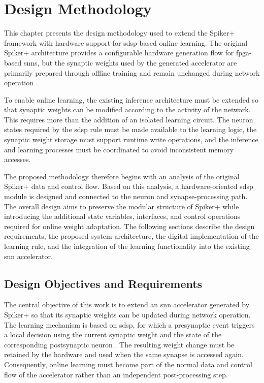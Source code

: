 \chapter{Design Methodology}
\label{sec:design_methodology}

This chapter presents the design methodology used to extend the Spiker+ framework with hardware support for \gls{sdsp}-based online learning. The original Spiker+ architecture provides a configurable hardware generation flow for \gls{fpga}-based \gls{snn}s, but the synaptic weights used by the generated accelerator are primarily prepared through offline training and remain unchanged during network operation \cite{Carpegna2025}.

To enable online learning, the existing inference architecture must be extended so that synaptic weights can be modified according to the activity of the network. This requires more than the addition of an isolated learning circuit. The neuron states required by the \gls{sdsp} rule must be made available to the learning logic, the synaptic weight storage must support runtime write operations, and the inference and learning processes must be coordinated to avoid inconsistent memory accesses.

The proposed methodology therefore begins with an analysis of the original Spiker+ data and control flow. Based on this analysis, a hardware-oriented \gls{sdsp} module is designed and connected to the neuron and synapse-processing path. The overall design aims to preserve the modular structure of Spiker+ while introducing the additional state variables, interfaces, and control operations required for online weight adaptation. The following sections describe the design requirements, the proposed system architecture, the digital implementation of the learning rule, and the integration of the learning functionality into the existing \gls{snn} accelerator.

\section{Design Objectives and Requirements}
\label{subsec: design objectives and requirements}

The central objective of this work is to extend an \gls{snn} accelerator generated by Spiker+ so that its synaptic weights can be updated during network operation. The learning mechanism is based on \gls{sdsp}, for which a presynaptic event triggers a local decision using the current synaptic weight and the state of the corresponding postsynaptic neuron \cite{Brader2007}. The resulting weight change must be retained by the hardware and used when the same synapse is accessed again. Consequently, online learning must become part of the normal data and control flow of the accelerator rather than an independent post-processing step.

